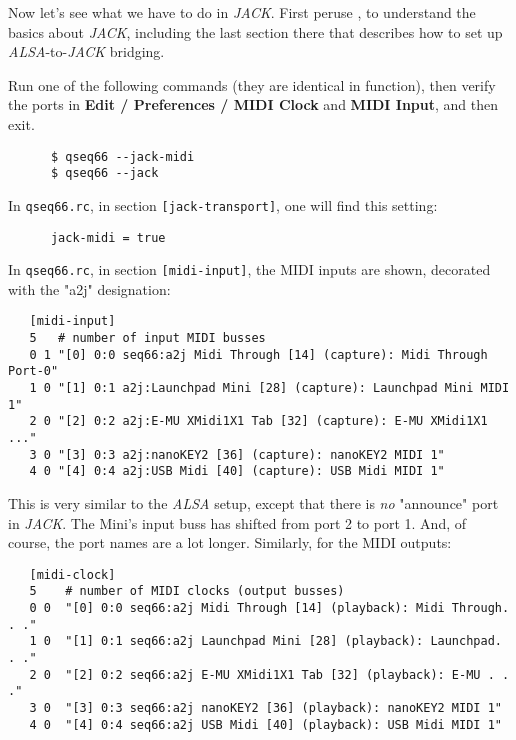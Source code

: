    Now let's see what we have to do in \textsl{JACK}.
   First peruse , to understand the basics about
   \textsl{JACK}, including the last section there that describes how to set up
   \textsl{ALSA}-to-\textsl{JACK} bridging.

   Run one of the following commands (they are identical in function),
   then verify the ports in
   \textbf{Edit / Preferences / MIDI Clock} and \textbf{MIDI Input}, and then
   exit.

   \begin{verbatim}
      $ qseq66 --jack-midi
      $ qseq66 --jack
   \end{verbatim}

   In \texttt{qseq66.rc}, in section \texttt{[jack-transport]},
   one will find this setting:

   \begin{verbatim}
      jack-midi = true
   \end{verbatim}

   In \texttt{qseq66.rc}, in section \texttt{[midi-input]},
   the MIDI inputs are shown, decorated with the "a2j" designation:

   \begin{verbatim}
   [midi-input]
   5   # number of input MIDI busses
   0 1 "[0] 0:0 seq66:a2j Midi Through [14] (capture): Midi Through Port-0"
   1 0 "[1] 0:1 a2j:Launchpad Mini [28] (capture): Launchpad Mini MIDI 1"
   2 0 "[2] 0:2 a2j:E-MU XMidi1X1 Tab [32] (capture): E-MU XMidi1X1 ..."
   3 0 "[3] 0:3 a2j:nanoKEY2 [36] (capture): nanoKEY2 MIDI 1"
   4 0 "[4] 0:4 a2j:USB Midi [40] (capture): USB Midi MIDI 1"
   \end{verbatim}

   This is very similar to the \textsl{ALSA} setup, except that there is
   \textsl{no}
   "announce" port in \textsl{JACK}.  The Mini's input buss has shifted from
   port 2 to port 1.  And, of course, the port names are a lot
   longer.  Similarly, for the MIDI outputs:

   \begin{verbatim}
   [midi-clock]
   5    # number of MIDI clocks (output busses)
   0 0  "[0] 0:0 seq66:a2j Midi Through [14] (playback): Midi Through. . ."
   1 0  "[1] 0:1 seq66:a2j Launchpad Mini [28] (playback): Launchpad. . ."
   2 0  "[2] 0:2 seq66:a2j E-MU XMidi1X1 Tab [32] (playback): E-MU . . ."
   3 0  "[3] 0:3 seq66:a2j nanoKEY2 [36] (playback): nanoKEY2 MIDI 1"
   4 0  "[4] 0:4 seq66:a2j USB Midi [40] (playback): USB Midi MIDI 1"
   \end{verbatim}

